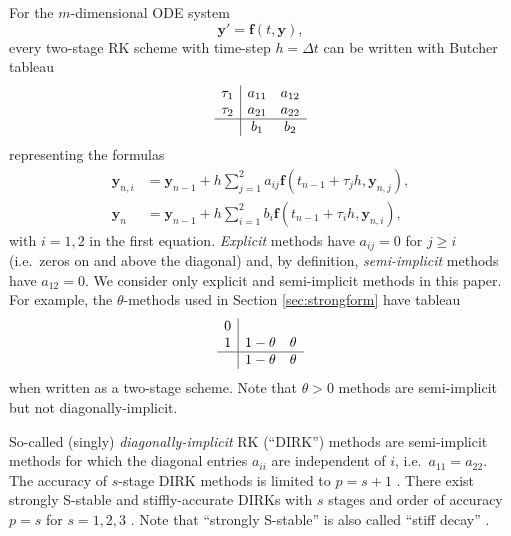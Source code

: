 \documentclass[final,leqno,onefignum,onetabnum]{siamltex1213bueler}
\newcommand\bbf{\mathbf{f}}
\newcommand\by{\mathbf{y}}
\begin{document}
For the $m$-dimensional ODE system
\begin{equation}
  \by' = \bbf(t,\by),  \label{eq:abstractODE}
\end{equation}
every two-stage RK scheme with time-step $h=\Delta t$ can be written with Butcher tableau \cite{AscherPetzold1998}
\begin{equation}
\begin{array}{c|cc}
\tau_1 & a_{11} & a_{12}  \\
\tau_2 & a_{21} & a_{22}  \\ \hline
       & b_1    & b_2     \\
\end{array}  \label{eq:tableau}
\end{equation}
representing the formulas
\begin{align*}
  \by_{n,i} &= \by_{n-1} + h \sum_{j=1}^2 a_{ij} \bbf(t_{n-1} + \tau_j h, \by_{n,j}), \\
      \by_n &= \by_{n-1} + h \sum_{i=1}^2 b_i \bbf(t_{n-1} + \tau_i h, \by_{n,i}),
\end{align*}
with $i=1,2$ in the first equation.  \emph{Explicit} methods have $a_{ij}=0$ for $j\ge i$ (i.e.~zeros on and above the diagonal) and, by definition, \emph{semi-implicit} methods have $a_{12}=0$.  We consider only explicit and semi-implicit methods in this paper.  For example, the $\theta$-methods used in Section \ref{sec:strongform} have tableau
\begin{equation*}
\begin{array}{c|cc}
0 &          &   \\
1 & 1-\theta & \theta  \\ \hline
  & 1-\theta & \theta  \\
\end{array}
\end{equation*}
when written as a two-stage scheme.  Note that $\theta>0$ methods are semi-implicit but not diagonally-implicit.

So-called (singly) \emph{diagonally-implicit} RK (``DIRK'') methods are semi-implicit methods for which the diagonal entries $a_{ii}$ are independent of $i$, i.e.~$a_{11}=a_{22}$.  The accuracy of $s$-stage DIRK methods is limited to $p=s+1$ \cite{AscherPetzold1998}.  There exist strongly S-stable and stiffly-accurate \cite{AscherPetzold1998} DIRKs with $s$ stages and order of accuracy $p=s$ for $s=1,2,3$ \cite{Alexander1977}.  Note that ``strongly S-stable'' is also called ``stiff decay'' \cite{AscherPetzold1998}.
\end{document}
